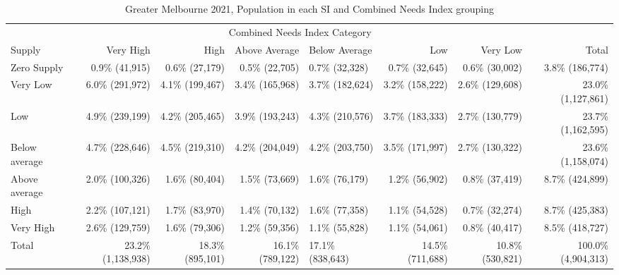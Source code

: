 \documentclass[preprint, 3p,
authoryear]{elsarticle} %
\begin{document}
\begin{table}

\caption{\label{tab:Greater_Melbourne_2021_needs_gap_population}Greater Melbourne 2021, Population in each SI and Combined Needs Index grouping}
\centering
\fontsize{6}{8}\selectfont
\begin{tabular}[t]{l|r|r|r|l|r|r|r}
\hline
\multicolumn{1}{c|}{ } & \multicolumn{6}{c|}{Combined Needs Index Category} & \multicolumn{1}{c}{ } \\
\cline{2-7}
Supply & Very High & High & Above Average & Below Average & Low & Very Low & Total\\
\hline
Zero Supply & 0.9\%    (41,915) & 0.6\%  (27,179) & 0.5\%  (22,705) & 0.7\%  (32,328) & 0.7\%  (32,645) & 0.6\%  (30,002) & 3.8\%   (186,774)\\
\hline
Very Low & 6.0\%   (291,972) & 4.1\% (199,467) & 3.4\% (165,968) & 3.7\% (182,624) & 3.2\% (158,222) & 2.6\% (129,608) & 23.0\% (1,127,861)\\
\hline
Low & 4.9\%   (239,199) & 4.2\% (205,465) & 3.9\% (193,243) & 4.3\% (210,576) & 3.7\% (183,333) & 2.7\% (130,779) & 23.7\% (1,162,595)\\
\hline
Below average & 4.7\%   (228,646) & 4.5\% (219,310) & 4.2\% (204,049) & 4.2\% (203,750) & 3.5\% (171,997) & 2.7\% (130,322) & 23.6\% (1,158,074)\\
\hline
Above average & 2.0\%   (100,326) & 1.6\%  (80,404) & 1.5\%  (73,669) & 1.6\%  (76,179) & 1.2\%  (56,902) & 0.8\%  (37,419) & 8.7\%   (424,899)\\
\hline
High & 2.2\%   (107,121) & 1.7\%  (83,970) & 1.4\%  (70,132) & 1.6\%  (77,358) & 1.1\%  (54,528) & 0.7\%  (32,274) & 8.7\%   (425,383)\\
\hline
Very High & 2.6\%   (129,759) & 1.6\%  (79,306) & 1.2\%  (59,356) & 1.1\%  (55,828) & 1.1\%  (54,061) & 0.8\%  (40,417) & 8.5\%   (418,727)\\
\hline
Total & 23.2\% (1,138,938) & 18.3\% (895,101) & 16.1\% (789,122) & 17.1\% (838,643) & 14.5\% (711,688) & 10.8\% (530,821) & 100.0\% (4,904,313)\\
\hline
\end{tabular}
\end{table}
\end{document}
